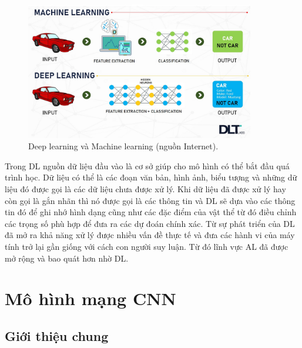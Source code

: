 \begin{figure}[!h]
	\centering
	\includegraphics[width=100mm]{fig/DlandML.jpg}
        \captionsetup{justification=centering}
	\caption{Deep learning và Machine learning (nguồn Internet).}
	\label{fig_DlandML}
\end{figure}

Trong DL nguồn dữ liệu đầu vào là cơ sở giúp cho mô hình có thể bắt đầu quá trình học. Dữ liệu có thể là các đoạn văn bản, hình ảnh, biểu tượng và những dữ liệu đó được gọi là các dữ liệu chưa được xử lý. Khi dữ liệu đã được xử lý hay còn gọi là gắn nhãn thì nó được gọi là các thông tin và DL sẽ dựa vào các thông tin đó để ghi nhớ hình dạng cũng như các đặc điểm của vật thể từ đó điều chỉnh các trọng số phù hợp để đưa ra các dự đoán chính xác. Từ sự phát triển của DL đã mở ra khả năng xử lý được nhiều vấn đề thực tế và đưa các hành vi của máy tính trở lại gần giống với cách con người suy luận. Từ đó lĩnh vực AL đã được mở rộng và bao quát hơn nhờ DL.  


\section{Mô hình mạng CNN}
\subsection{Giới thiệu chung}



